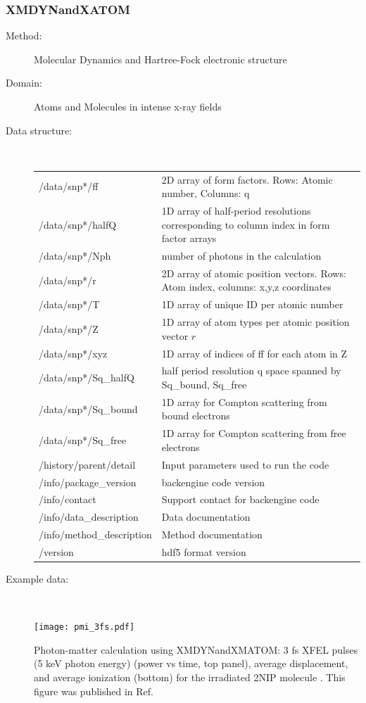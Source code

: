 \documentclass[12pt]{scrartcl}
\begin{document}
\subsubsection{XMDYNandXATOM\label{sec:interface_pmi_xmdyn}}
\begin{description}
  \item[Method:] Molecular Dynamics and Hartree-Fock electronic structure
  \item[Domain:] Atoms and Molecules in intense x-ray fields
  \item[Data structure:]\ \\
{\scriptsize%
\begin{tabular}{l|l}
  \hline
  \hline
  /data/snp*/ff        & 2D array of form factors. Rows: Atomic number, Columns: q  \\
  /data/snp*/halfQ        & 1D array of half-period resolutions corresponding to
  column index in form factor arrays \\
  /data/snp*/Nph        & number of photons in the calculation \\
  /data/snp*/r        & 2D array of atomic position vectors. Rows: Atom index,
  columns: x,y,z coordinates \\
  /data/snp*/T        & 1D array of unique ID per atomic number \\
  /data/snp*/Z        &  1D array of atom types per atomic position vector
  $r$\\
  /data/snp*/xyz        & 1D array of indices of ff for each atom in Z \\
  /data/snp*/Sq\_halfQ        & half period resolution q space spanned by
  Sq\_bound, Sq\_free \\
  /data/snp*/Sq\_bound        & 1D array for Compton scattering from bound electrons \\
  /data/snp*/Sq\_free        & 1D array for Compton scattering from free
  electrons \\
  /history/parent/detail        & Input parameters used to run the code \\
  /info/package\_version        & backengine code version \\
  /info/contact        & Support contact for backengine code \\
  /info/data\_description        & Data documentation \\
  /info/method\_description        & Method documentation \\
  /version                   & hdf5 format version \\
  \hline
  \hline
\end{tabular}
}
\item[Example data:]\ \\
      \begin{center}
        \texttt{[image: pmi\_3fs.pdf]}
      \end{center}
      \scriptsize{Photon-matter calculation using XMDYNandXMATOM:
        3 fs XFEL pulses (5 keV photon energy) (power vs time, top panel), average displacement, and average ionization
        (bottom) \cite{Fortmann-Grote2016b} for the irradiated 2NIP molecule \cite{Schlessman1998}.
        This figure was published in Ref.~\cite{Fortmann-Grote2017}}
\end{description}
%
\end{document}
